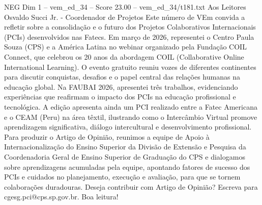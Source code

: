 \begin{textsample}{NEG Dim 1 – vem\_ed\_34 – Score 23.00 – vem\_ed\_34/t181.txt}  \label{ex:f1_neg_180}
Aos Leitores Osvaldo Succi Jr. - Coordenador de Projetos Este número de VEm convida a refletir sobre a consolidação e o futuro dos Projetos Colaborativos Internacionais (PCIs) desenvolvidos nas Fatecs.
Em março de 2026, representei o Centro Paula Souza (CPS) e a América Latina no webinar organizado pela Fundação COIL Connect, que celebrou os 20 anos da abordagem COIL (Collaborative Online International Learning).
O evento gratuito reuniu vozes de diferentes continentes para discutir conquistas, desafios e o papel central das relações humanas na educação global.
Na FAUBAI 2026, apresentei três trabalhos, evidenciando experiências que reafirmam o impacto dos PCIs na educação profissional e tecnológica.
A edição apresenta ainda um PCI realizado entre a Fatec Americana e o CEAM (Peru) na área têxtil, ilustrando como o Intercâmbio Virtual promove aprendizagem significativa, diálogo intercultural e desenvolvimento profissional.
Para produzir o Artigo de Opinião, reunimos a equipe de Apoio à Internacionalização do Ensino Superior da Divisão de Extensão e Pesquisa da Coordenadoria Geral de Ensino Superior de Graduação do CPS e dialogamos sobre aprendizagens acumuladas pela equipe, apontando fatores de sucesso dos PCIs e cuidados no planejamento, execução e avaliação, para que se tornem colaborações duradouras.
Deseja contribuir com Artigo de Opinião?
Escreva para cgesg.pci@cps.sp.gov.br.
Boa leitura!

\end{textsample}
